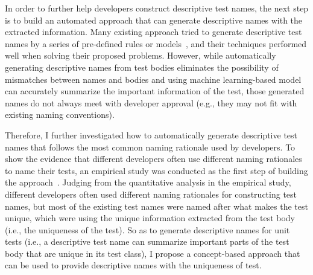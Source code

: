 In order to further help developers construct descriptive test names, the next step is to build an automated approach that can generate descriptive names with the extracted information.
%
Many existing approach tried to generate descriptive test names by a series of pre-defined rules or models~\cite{arcuri2014automated, zhang2015automatically, allamanis2015suggesting, daka2017generating, li2019deepfl}, and their techniques performed well when solving their proposed problems.
However, while automatically generating descriptive names from test bodies eliminates the possibility of mismatches between names and bodies and using machine learning-based model can accurately summarize the important information of the test, those generated names do not always meet with developer approval (e.g., they may not fit with existing naming conventions).


Therefore, I further investigated how to automatically generate descriptive test names that follows the most common naming rationale used by developers.
%
To show the evidence that different developers often use different naming rationales to name their tests, an empirical study was conducted as the first step of building the approach~\cite{emp-study}.
%
Judging from the quantitative analysis in the empirical study, different developers often used different naming rationales for constructing test names, but most of the existing test names were named after what makes the test unique, which were using the unique information extracted from the test body (i.e., the uniqueness of the test).
%
So as to generate descriptive names for unit tests (i.e., a descriptive test name can summarize important parts of the test body that are unique in its test class), I propose a concept-based approach that can be used to provide descriptive names with the uniqueness of test.


